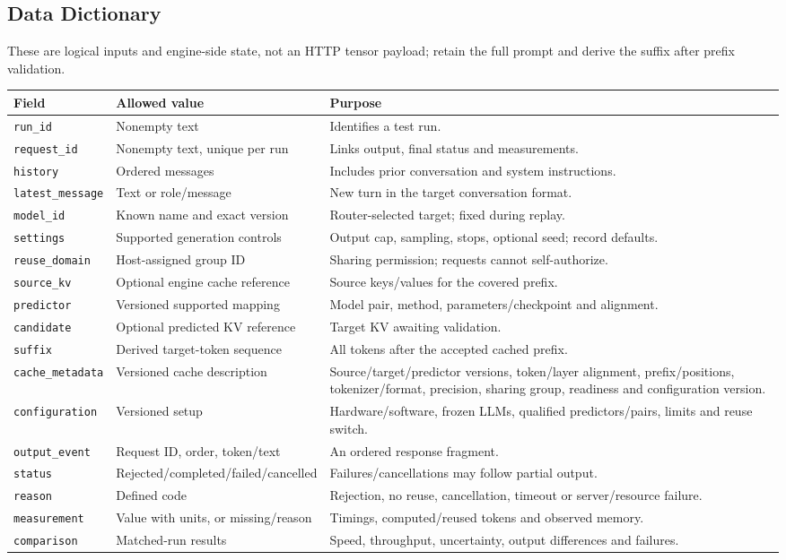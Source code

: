 \documentclass[12pt]{article}
\begin{document}
\subsection{Data Dictionary}
These are logical inputs and engine-side state, not an HTTP tensor payload;
retain the full prompt and derive the suffix after prefix validation.
\begin{longtable}{@{}p{}p{}p{}@{}}
\toprule Field & Allowed value & Purpose\\\midrule\endhead
\texttt{run\_id} & Nonempty text & Identifies a test run.\\
\texttt{request\_id} & Nonempty text, unique per run & Links output, final status and measurements.\\
\texttt{history} & Ordered messages & Includes prior conversation and system instructions.\\
\texttt{latest\_message} & Text or role/message & New turn in the target conversation format.\\
\texttt{model\_id} & Known name and exact version & Router-selected target; fixed during replay.\\
\texttt{settings} & Supported generation controls & Output cap, sampling, stops, optional seed; record defaults.\\
\texttt{reuse\_domain} & Host-assigned group ID & Sharing permission; requests cannot self-authorize.\\
\texttt{source\_kv} & Optional engine cache reference & Source keys/values for the covered prefix.\\
\texttt{predictor} & Versioned supported mapping & Model pair, method, parameters/checkpoint and alignment.\\
\texttt{candidate} & Optional predicted KV reference & Target KV awaiting validation.\\
\texttt{suffix} & Derived target-token sequence & All tokens after the accepted cached prefix.\\
\texttt{cache\_metadata} & Versioned cache description & Source/target/predictor versions, token/layer alignment, prefix/positions, tokenizer/format, precision, sharing group, readiness and configuration version.\\
\texttt{configuration} & Versioned setup & Hardware/software, frozen LLMs, qualified predictors/pairs, limits and reuse switch.\\
\texttt{output\_event} & Request ID, order, token/text & An ordered response fragment.\\
\texttt{status} & Rejected/completed/failed/cancelled & Failures/cancellations may follow partial output.\\
\texttt{reason} & Defined code & Rejection, no reuse, cancellation, timeout or server/resource failure.\\
\texttt{measurement} & Value with units, or missing/reason & Timings, computed/reused tokens and observed memory.\\
\texttt{comparison} & Matched-run results & Speed, throughput, uncertainty, output differences and failures.\\
\bottomrule
\end{longtable}
\end{document}
